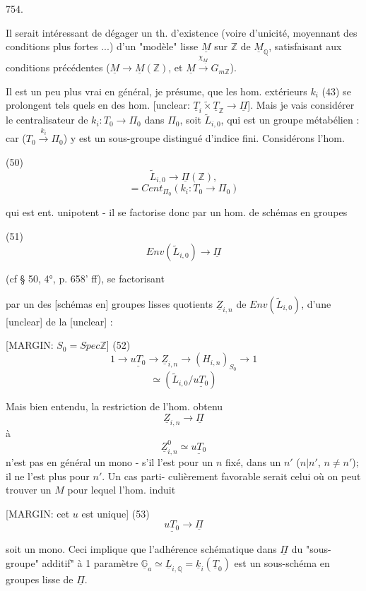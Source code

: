 754.

Il serait intéressant de dégager un th. d'existence
(voire d'unicité, moyennant des conditions plus fortes
...) d'un "modèle" lisse $\underline{M}$ sur $\mathbb{Z}$ de $\underline{M}_{\mathbb{Q}}$,
satisfaisant aux conditions précédentes
($\underline{M} \rightarrow \underline{M}(\mathbb{Z})$, et $\underline{M} \xrightarrow{\chi_{\underline{M}}} G_{m \mathbb{Z}}$).

Il est un peu plus vrai en général, je
présume, que les hom. extérieurs $k_i$ (43) se
prolongent tels quels en des hom.
[unclear: $\underline{T}_i \tilde{\times} \underline{T}_{\mathbb{Z}} \rightarrow \underline{\Pi}$]. Mais je vais considérer
le centralisateur de $k_i : T_0 \rightarrow \Pi_0$ dans $\Pi_0$,
soit $\tilde{L}_{i,0}$, qui est un groupe
métabélien : car ($T_0 \xrightarrow{k_i} \Pi_0$) y est un
sous-groupe distingué d'indice fini. Considérons
l'hom.

(50)
$$ \tilde{L}_{i,0} \longrightarrow \underline{\Pi}(\mathbb{Z}) , $$
$$ = Cent_{\Pi_0}(k_i : T_0 \rightarrow \Pi_0) $$

qui est ent. unipotent - il se factorise
donc par un hom. de schémas en groupes

(51)
$$ Env(\tilde{L}_{i,0}) \rightarrow \underline{\Pi} $$

(cf § 50, 4°, p. 658' ff), se factorisant

\newpage


par un des [schémas en] groupes lisses quotients $\underline{Z}_{i,n}$ de
$Env(\tilde{L}_{i,0})$, d'une [unclear] de la [unclear] :

[MARGIN: $S_0 = Spec \mathbb{Z}$]
(52) $$1 \to \underline{uT_0} \to \underline{Z}_{i,n} \to (H_{i,n})_{S_0} \to 1$$
$$ \simeq (\tilde{L}_{i,0}/\underline{uT_0}) $$

Mais bien entendu, la restriction de l'hom.
obtenu
$$ \underline{Z}_{i,n} \to \underline{\Pi} $$
à
$$ \underline{Z}_{i,n}^0 \simeq \underline{uT_0} $$
n'est pas en général un mono - s'il
l'est pour un $n$ fixé, dans un $n'$ ($n|n'$, $n \neq n'$);
il ne l'est plus pour $n'$. Un cas parti-
culièrement favorable serait celui où
on peut trouver un $M$ pour lequel l'hom.
induit

[MARGIN: cet $u$ est unique]
(53) $$ \underline{uT_0} \to \underline{\Pi} $$

soit un mono. Ceci implique que l'adhérence
schématique dans $\underline{\Pi}$ du "sous-groupe"
additif" à 1 paramètre $\underline{\mathbb{G}}_a \simeq \underline{L}_{i,\mathbb{Q}} = \underline{k}_i(\underline{T}_0)$
est un sous-schéma en groupes lisse de $\underline{\Pi}$.

